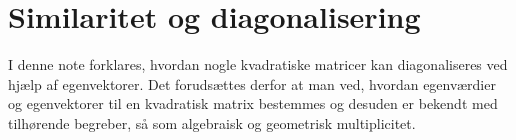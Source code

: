 
\setcounter{chapter}{9} %


\chapter{Similaritet og diagonalisering} \label{tn10}

\begin{basis}
I denne note forklares, hvordan nogle kvadratiske matricer kan diagonaliseres ved hjælp af egenvektorer. Det forudsættes derfor at man ved, hvordan egenværdier og egenvektorer til en kvadratisk matrix bestemmes og desuden er bekendt med tilhørende begreber, så som algebraisk og geometrisk multiplicitet. 
\end{basis}

